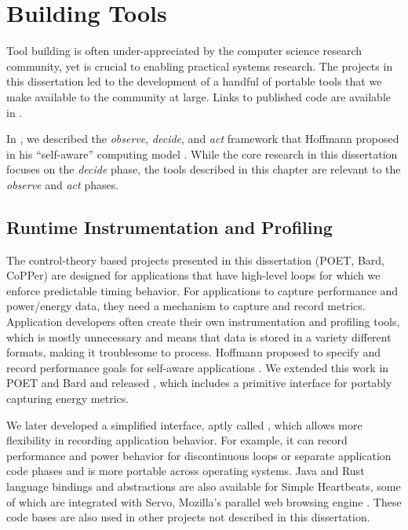 \chapter{Building Tools}
\label{app:tools}

Tool building is often under-appreciated by the computer science research community, yet is crucial to enabling practical systems research.
The projects in this dissertation led to the development of a handful of portable tools that we make available to the community at large.
Links to published code are available in .

In , we described the \emph{observe}, \emph{decide}, and \emph{act} framework that Hoffmann proposed in his ``self-aware'' computing model \cite{HoffmannPhD}.
While the core research in this dissertation focuses on the \emph{decide} phase, the tools described in this chapter are relevant to the \emph{observe} and \emph{act} phases.


\section{Runtime Instrumentation and Profiling}
\label{app:profiling}

The control-theory based projects presented in this dissertation (POET, Bard, CoPPer) are designed for applications that have high-level loops for which we enforce predictable timing behavior.
For applications to capture performance and power/energy data, they need a mechanism to capture and record metrics.
Application developers often create their own instrumentation and profiling tools, which is mostly unnecessary and means that data is stored in a variety different formats, making it troublesome to process.
Hoffmann \etal proposed  to specify and record performance goals for self-aware applications \cite{icac2010heartbeats}.
We extended this work in POET and Bard and released , which includes a primitive interface for portably capturing energy metrics.

We later developed a simplified interface, aptly called , which allows more flexibility in recording application behavior.
For example, it can record performance and power behavior for discontinuous loops or separate application code phases and is more portable across operating systems.
Java and Rust language bindings and abstractions are also available for Simple Heartbeats, some of which are integrated with Servo, Mozilla's parallel web browsing engine \cite{servo}.
These code bases are also used in other projects not described in this dissertation.

